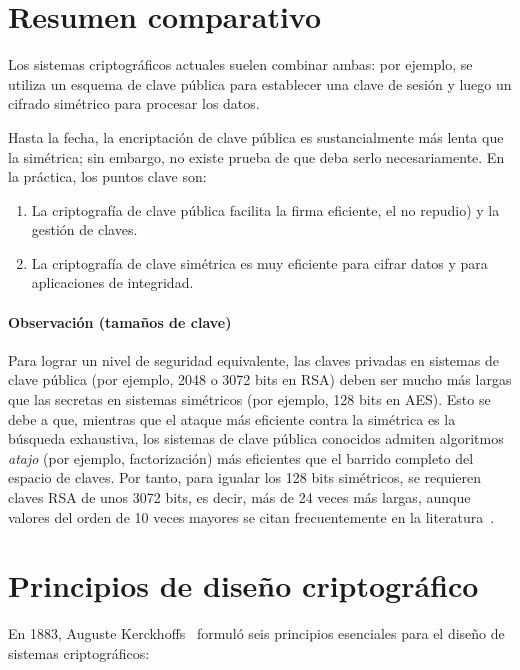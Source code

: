 \section{Resumen comparativo}
Los sistemas criptográficos actuales suelen combinar ambas: por ejemplo, se utiliza un esquema de clave pública para establecer una clave de sesión y luego un cifrado simétrico para procesar los datos.   

Hasta la fecha, la encriptación de clave pública es sustancialmente más lenta que la simétrica; sin embargo, no existe prueba de que deba serlo necesariamente. En la práctica, los puntos clave son:  
\begin{enumerate}
  \item La criptografía de clave pública facilita la firma eficiente, el no repudio) y la gestión de claves.  
  \item La criptografía de clave simétrica es muy eficiente para cifrar datos y para aplicaciones de integridad.  
\end{enumerate}

\paragraph{Observación (tamaños de clave)}  
Para lograr un nivel de seguridad equivalente, las claves privadas en sistemas de clave pública (por ejemplo, 2048 o 3072 bits en RSA) deben ser mucho más largas que las secretas en sistemas simétricos (por ejemplo, 128 bits en AES). Esto se debe a que, mientras que el ataque más eficiente contra la simétrica es la búsqueda exhaustiva, los sistemas de clave pública conocidos admiten algoritmos \emph{atajo} (por ejemplo, factorización) más eficientes que el barrido completo del espacio de claves. Por tanto, para igualar los 128 bits simétricos, se requieren claves RSA de unos 3072 bits, es decir, más de 24 veces más largas, aunque valores del orden de 10 veces mayores se citan frecuentemente en la literatura~\citep{stackexchange-rsa-strength}.

\section{Principios de diseño criptográfico}

En 1883, Auguste Kerckhoffs~\cite{petitcolas2011kerckhoffs} formuló seis principios esenciales para el diseño de sistemas criptográficos:

